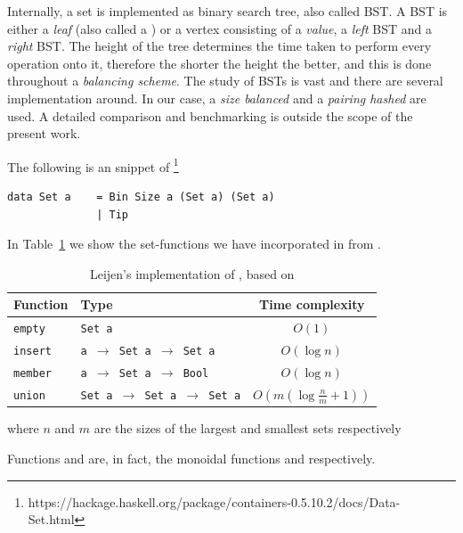 Internally, a set is implemented as binary search tree, also called BST. A BST is either a \textit{leaf} (also called a ) or a vertex consisting of a \textit{value}, a \textit{left} BST and a \textit{right} BST. The height of the tree determines the time taken to perform every operation onto it, therefore the shorter the height the better, and this is done throughout a \textit{balancing scheme}. The study of BSTs is vast and there are several implementation around. In our case, a \textit{size balanced} and a \textit{pairing hashed} are used. A detailed comparison and benchmarking is outside the scope of the present work.

The following is an snippet of  \footnote{https://hackage.haskell.org/package/containers-0.5.10.2/docs/Data-Set.html}
\begin{lstlisting}
data Set a    = Bin Size a (Set a) (Set a)
              | Tip
\end{lstlisting}              

In Table~\ref{tab:Setfuncs} we show the set-functions we have incorporated in  from .
\small
\begin{table}[H]
\begin{center}
\begin{tabular}{||l | l | c||} 
 \hline
 Function         & Type                                   & Time complexity            \\ 
 \hline\hline
 \texttt{empty}   & \texttt{Set a}                         & $O(1)$                     \\ 
 \hline
 \texttt{insert}  & \texttt{a $\to$ Set a $\to$ Set a}     & $O(\log n)$                \\
 \hline
 \texttt{member}  & \texttt{a $\to$ Set a $\to$ Bool}      & $O(\log n)$                \\ 
 \hline
 \texttt{union}   & \texttt{Set a $\to$ Set a $\to$ Set a} & $O(m(\log\frac{n}{m} +1))$ \\
 \hline
\end{tabular}
\caption{Leijen's implementation of  \cite{HaskellSet}, based on \cite{ParallelSets}}
\label{tab:Setfuncs} 
\end{center}
where $n$ and $m$ are the sizes of the largest and smallest sets respectively
\end{table}
\normalsize

Functions  and  are, in fact, the monoidal functions  and  respectively. 

